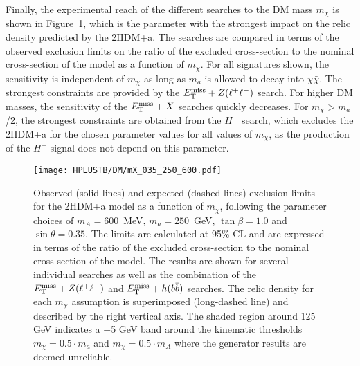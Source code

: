 Finally, the experimental reach of the different searches to the DM mass $m_\chi$ is shown in Figure~\ref{Hplustb:2HDMa_mchi}, which is the parameter with the strongest impact on the relic density predicted by the 2HDM+a. The searches are compared in terms of the observed exclusion limits on the ratio of the excluded cross-section to the nominal cross-section of the model as a function of $m_\chi$. For all signatures shown, the sensitivity is independent of $m_\chi$ as long as $m_a$ is allowed to decay into $\chi\bar{\chi}$. The strongest constraints are provided by the $E_{\text{T}}^{\text{miss}}+ Z(\ell^+\ell^-)$ search. For higher DM masses, the sensitivity of the $E_{\text{T}}^{\text{miss}}+X$ searches quickly decreases. For $m_\chi>m_a$/2, the strongest constraints are obtained from the $H^+$ search, which excludes the 2HDM+a for the chosen parameter values for all values of $m_\chi$, as the production of the $H^+$ signal does not depend on this parameter.\\

\begin{figure}[htb]
    \RawFloats
    \centering
    \texttt{[image: HPLUSTB/DM/mX\_035\_250\_600.pdf]}
    \caption{Observed (solid lines) and expected (dashed lines) exclusion limits for the 2HDM+a model as a function of $m_\chi$, following the parameter choices of $m_A = 600$~MeV, $m_a = 250$~GeV, $\tan\beta= 1.0$ and $\sin\theta=0.35$. The limits are calculated at 95\% CL and are expressed in terms of the ratio of the excluded cross-section to the nominal cross-section of the model. The results are shown for several individual searches as well as the combination of the $E_{\text{T}}^{\text{miss}}+Z(\ell^+\ell^-)$ and $E_{\text{T}}^{\text{miss}}+h(b\bar{b})$ searches. The relic density for each $m_\chi$ assumption is superimposed (long-dashed line) and described by the right vertical axis. The shaded region around 125 GeV indicates a $\pm$5 GeV band around the kinematic thresholds $m_\chi= 0.5 \cdot m_a$ and $m_\chi = 0.5 \cdot m_A$ where the generator
    results are deemed unreliable.}
    \label{Hplustb:2HDMa_mchi}
\end{figure}


